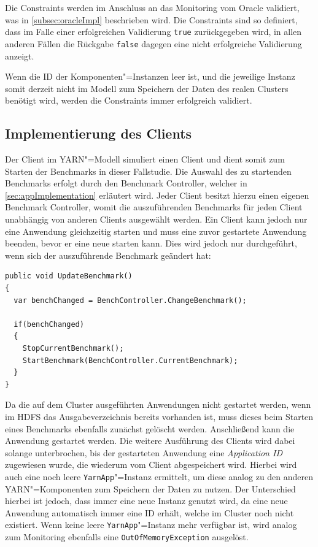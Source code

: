 Die Constraints werden im Anschluss an das Monitoring vom Oracle validiert, was in \cref{subsec:oracleImpl} beschrieben wird.
Die Constraints sind so definiert, dass im Falle einer erfolgreichen Validierung \texttt{true} zurückgegeben wird, in allen anderen Fällen die Rückgabe \texttt{false} dagegen eine nicht erfolgreiche Validierung anzeigt.

Wenn die ID der Komponenten"=Instanzen leer ist, und die jeweilige Instanz somit derzeit nicht im Modell zum Speichern der Daten des realen Clusters benötigt wird, werden die Constraints immer erfolgreich validiert.

\subsection{Implementierung des Clients}
\label{subsec:yarnClient}

Der Client im \ac{YARN}"=Modell simuliert einen Client und dient somit zum Starten der Benchmarks in dieser Fallstudie.
Die Auswahl des zu startenden Benchmarks erfolgt durch den Benchmark Controller, welcher in \cref{sec:appImplementation} erläutert wird.
Jeder Client besitzt hierzu einen eigenen Benchmark Controller, womit die auszuführenden Benchmarks für jeden Client unabhängig von anderen Clients ausgewählt werden.
Ein Client kann jedoch nur eine Anwendung gleichzeitig starten und muss eine zuvor gestartete Anwendung beenden, bevor er eine neue starten kann.
Dies wird jedoch nur durchgeführt, wenn sich der auszuführende Benchmark geändert hat:

\begin{lstlisting}[label=lst:startClientBenchmark,style=cs,
caption={[Auswahl und Start des nachfolgenden Benchmarks]
    Auswahl und Start des nachfolgenden Benchmarks (gekürzt).
    Der Benchmark Controller und seine Methode \texttt{BenchmarkController.ChangeBenchmark()} wird in \cref{sec:appImplementation} erläutert.}]
public void UpdateBenchmark()
{
  var benchChanged = BenchController.ChangeBenchmark();
  
  if(benchChanged)
  {
    StopCurrentBenchmark();
    StartBenchmark(BenchController.CurrentBenchmark);
  }
}
\end{lstlisting}

Da die auf dem Cluster ausgeführten Anwendungen \uU nicht gestartet werden, wenn im \ac{HDFS} das Ausgabeverzeichnis bereits vorhanden ist, muss dieses beim Starten eines Benchmarks ebenfalls zunächst gelöscht werden.
Anschließend kann die Anwendung gestartet werden.
Die weitere Ausführung des Clients wird dabei solange unterbrochen, bis der gestarteten Anwendung eine \emph{Application ID} zugewiesen wurde, die wiederum vom Client abgespeichert wird.
Hierbei wird auch eine noch leere \texttt{YarnApp}"=Instanz ermittelt, um diese analog zu den anderen \ac{YARN}"=Komponenten zum Speichern der Daten zu nutzen.
Der Unterschied hierbei ist jedoch, dass immer eine neue Instanz genutzt wird, da eine neue Anwendung automatisch immer eine ID erhält, welche im Cluster noch nicht existiert.
Wenn keine leere \texttt{YarnApp}"=Instanz mehr verfügbar ist, wird analog zum Monitoring ebenfalls eine \texttt{OutOfMemoryException} ausgelöst.

